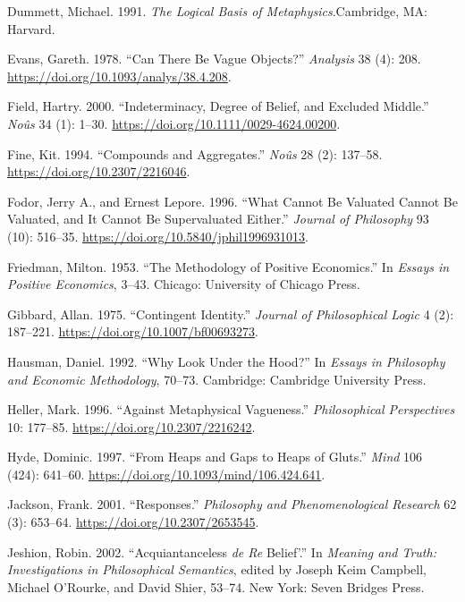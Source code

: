 \documentclass[
  11pt,
  letterpaper,
  DIV=11,
  numbers=noendperiod,
  oneside]{scrartcl}
\newlength{\cslhangindent}
\newenvironment{CSLReferences}[2] %
 {\begin{list}{}{%
  \setlength{\itemindent}{0pt}
  \setlength{\leftmargin}{0pt}
  \setlength{\parsep}{0pt}
  \ifodd #1
   \setlength{\leftmargin}{\cslhangindent}
   \setlength{\itemindent}{-1\cslhangindent}
  \fi
  \setlength{\itemsep}{#2\baselineskip}}}
 {\end{list}}
\begin{document}
\label{refs}
\begin{CSLReferences}{1}{0}
Dummett, Michael. 1991. \emph{The Logical Basis of
Metaphysics}.Cambridge, MA: Harvard.

Evans, Gareth. 1978. {``Can There Be Vague Objects?''} \emph{Analysis}
38 (4): 208. \url{https://doi.org/10.1093/analys/38.4.208}.

Field, Hartry. 2000. {``Indeterminacy, Degree of Belief, and Excluded
Middle.''} \emph{No{û}s} 34 (1): 1--30.
\url{https://doi.org/10.1111/0029-4624.00200}.

Fine, Kit. 1994. {``Compounds and Aggregates.''} \emph{No{û}s} 28 (2):
137--58. \url{https://doi.org/10.2307/2216046}.

Fodor, Jerry A., and Ernest Lepore. 1996. {``What Cannot Be Valuated
Cannot Be Valuated, and It Cannot Be Supervaluated Either.''}
\emph{Journal of Philosophy} 93 (10): 516--35.
\url{https://doi.org/10.5840/jphil1996931013}.

Friedman, Milton. 1953. {``The Methodology of Positive Economics.''} In
\emph{Essays in Positive Economics}, 3--43. Chicago: University of
Chicago Press.

Gibbard, Allan. 1975. {``Contingent Identity.''} \emph{Journal of
Philosophical Logic} 4 (2): 187--221.
\url{https://doi.org/10.1007/bf00693273}.

Hausman, Daniel. 1992. {``Why Look Under the Hood?''} In \emph{Essays in
Philosophy and Economic Methodology}, 70--73. Cambridge: Cambridge
University Press.

Heller, Mark. 1996. {``Against Metaphysical Vagueness.''}
\emph{Philosophical Perspectives} 10: 177--85.
\url{https://doi.org/10.2307/2216242}.

Hyde, Dominic. 1997. {``From Heaps and Gaps to Heaps of Gluts.''}
\emph{Mind} 106 (424): 641--60.
\url{https://doi.org/10.1093/mind/106.424.641}.

Jackson, Frank. 2001. {``Responses.''} \emph{Philosophy and
Phenomenological Research} 62 (3): 653--64.
\url{https://doi.org/10.2307/2653545}.

Jeshion, Robin. 2002. {``Acquiantanceless \emph{de Re} Belief'.''} In
\emph{Meaning and Truth: Investigations in Philosophical Semantics},
edited by Joseph Keim Campbell, Michael O'Rourke, and David Shier,
53--74. New York: Seven Bridges Press.


\end{CSLReferences}
\end{document}

